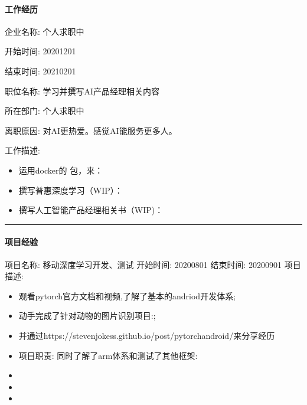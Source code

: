 \documentclass[letterpaper,10pt,english]{sphinxmanual}
\begin{document}
\paragraph{工作经历}
\label{\detokenize{get_started:id3}}
企业名称: 个人求职中

开始时间: 2020\sphinxhyphen{}12\sphinxhyphen{}01

结束时间: 2021\sphinxhyphen{}02\sphinxhyphen{}01

职位名称: 学习并撰写AI产品经理相关内容

所在部门: 个人求职中

离职原因: 对AI更热爱。感觉AI能服务更多人。

工作描述:
\begin{itemize}
\item {} 
运用docker的  包，来：

\item {} 
撰写普惠深度学习（WIP）：

\item {} 
撰写人工智能产品经理相关书（WIP)：

\end{itemize}


\bigskip\hrule\bigskip



\paragraph{项目经验}
\label{\detokenize{get_started:id4}}
项目名称: 移动深度学习开发、测试 开始时间: 2020\sphinxhyphen{}08\sphinxhyphen{}01 结束时间:
2020\sphinxhyphen{}09\sphinxhyphen{}01 项目描述:
\begin{itemize}
\item {} 
观看pytorch官方文档和视频,了解了基本的andriod开发体系;

\item {} 
动手完成了针对动物的图片识别项目:;

\item {} 
并通过https://stevenjokess.github.io/post/pytorch\sphinxhyphen{}android/来分享经历

\item {} 
项目职责: 同时了解了arm体系和测试了其他框架:

\item {} 

\item {} 

\item {} 

\end{itemize}
\end{document}
